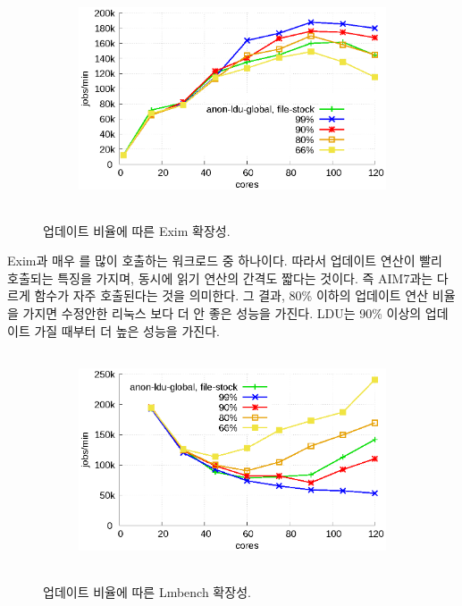 \begin{figure}[h!]
    \centering
    \begin{subfigure}[b]{1\textwidth}
        \includegraphics[height=2.5in]{graph/ratio_exim_core.eps}
    \end{subfigure}%
    \caption{업데이트 비율에 따른 Exim 확장성.}
    \label{fig:UpdateRate_exim_2}
\end{figure}


Exim과 매우 를 많이 호출하는 워크로드 중 하나이다. 
따라서 업데이트 연산이 빨리 호출되는 특징을 가지며, 동시에 읽기 연산의 간격도 짧다는 것이다. 
즉 AIM7과는 다르게  함수가 자주 호출된다는 것을 의미한다.
그 결과, 80\% 이하의 업데이트 연산 비율을 가지면 수정안한 리눅스 보다 더 안 좋은 성능을 가진다.
LDU는 90\% 이상의 업데이트 가질 때부터 더 높은 성능을 가진다.

\begin{figure}[h!]
    \centering
    \begin{subfigure}[b]{1\textwidth}
        \includegraphics[height=2.5in]{graph/ratio_lmbench_core.eps}
    \end{subfigure}%
    \caption{업데이트 비율에 따른 Lmbench 확장성.}
    \label{fig:UpdateRate_lmbench_2}
\end{figure}


